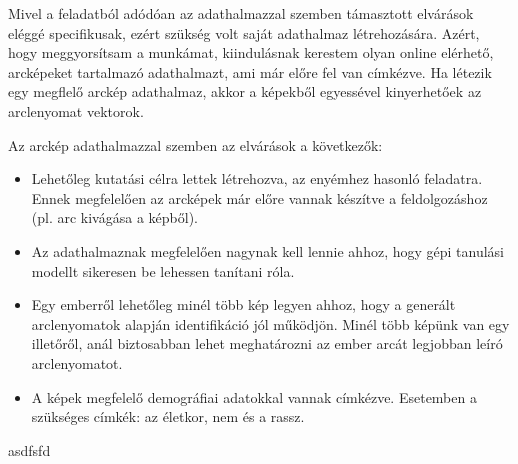 Mivel a feladatból adódóan az adathalmazzal szemben támasztott elvárások eléggé specifikusak, ezért szükség volt saját adathalmaz létrehozására. Azért, hogy meggyorsítsam a munkámat, kiindulásnak kerestem olyan online elérhető, arcképeket tartalmazó adathalmazt, ami már előre fel van címkézve. Ha létezik egy megflelő arckép adathalmaz, akkor a képekből egyessével kinyerhetőek az arclenyomat vektorok. 

Az arckép adathalmazzal szemben az elvárások a következők:
\begin{itemize}
	\item Lehetőleg kutatási célra lettek létrehozva, az enyémhez hasonló feladatra. Ennek megfelelően az arcképek már előre vannak készítve a feldolgozáshoz (pl. arc kivágása a képből).
	\item Az adathalmaznak megfelelően nagynak kell lennie ahhoz, hogy gépi tanulási modellt sikeresen be lehessen tanítani róla.
	\item Egy emberről lehetőleg minél több kép legyen ahhoz, hogy a generált arclenyomatok alapján identifikáció jól működjön. Minél több képünk van egy illetőről, anál biztosabban lehet meghatározni az ember arcát legjobban leíró arclenyomatot.
	\item A képek megfelelő demográfiai adatokkal vannak címkézve. Esetemben a szükséges címkék: az életkor, nem és a rassz.
\end{itemize}

asdfsfd




















